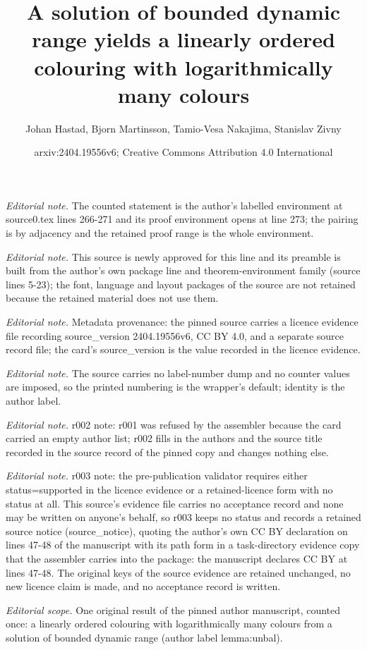 \documentclass[10pt,a4paper]{article}
\title{A solution of bounded dynamic range yields a linearly ordered colouring with logarithmically many colours}
\author{Johan Hastad, Bjorn Martinsson, Tamio-Vesa Nakajima, Stanislav Zivny}
\date{arxiv:2404.19556v6; Creative Commons Attribution 4.0 International}
\theoremstyle{plain}
\theoremstyle{definition}
\begin{document}
\maketitle
\noindent\textit{Editorial note.} The counted statement is the author's labelled environment at source0.tex lines 266-271 and its proof environment opens at line 273; the pairing is by adjacency and the retained proof range is the whole environment.\par\medskip
\noindent\textit{Editorial note.} This source is newly approved for this line and its preamble is built from the author's own package line and theorem-environment family (source lines 5-23); the font, language and layout packages of the source are not retained because the retained material does not use them.\par\medskip
\noindent\textit{Editorial note.} Metadata provenance: the pinned source carries a licence evidence file recording source\_version 2404.19556v6, CC BY 4.0, and a separate source record file; the card's source\_version is the value recorded in the licence evidence.\par\medskip
\noindent\textit{Editorial note.} The source carries no label-number dump and no counter values are imposed, so the printed numbering is the wrapper's default; identity is the author label.\par\medskip
\noindent\textit{Editorial note.} r002 note: r001 was refused by the assembler because the card carried an empty author list; r002 fills in the authors and the source title recorded in the source record of the pinned copy and changes nothing else.\par\medskip
\noindent\textit{Editorial note.} r003 note: the pre-publication validator requires either status=supported in the licence evidence or a retained-licence form with no status at all. This source's evidence file carries no acceptance record and none may be written on anyone's behalf, so r003 keeps no status and records a retained source notice (source\_notice), quoting the author's own CC BY declaration on lines 47-48 of the manuscript with its path form in a task-directory evidence copy that the assembler carries into the package: the manuscript declares CC BY at lines 47-48. The original keys of the source evidence are retained unchanged, no new licence claim is made, and no acceptance record is written.\par\medskip
\noindent\textit{Editorial scope.} One original result of the pinned author manuscript, counted once: a linearly ordered colouring with logarithmically many colours from a solution of bounded dynamic range (author label lemma:unbal).\par\medskip
\end{document}
